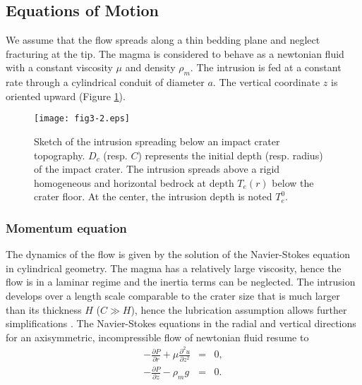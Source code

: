 \subsection{Equations of Motion}
	
We assume that the flow spreads along a thin bedding plane and neglect
fracturing  at the  tip.   The  magma is  considered  to  behave as  a
newtonian  fluid   with  a   constant  viscosity  $\mu$   and  density
$\rho_{m}$.   The  intrusion is  fed  at  a  constant rate  through  a
cylindrical conduit of  diameter $a$.  The vertical  coordinate $z$ is
oriented upward (Figure \ref{C5-fig3-2}).

\begin{figure}[h!]
  \graphicspath{ {/Users/thorey/Documents/These/Submission/Article/FFC_JGR_2013/Paper_APRES_2nd_REVIEW/} }
  \begin{center}
    \texttt{[image: fig3-2.eps]}
    \caption{Sketch of the intrusion  spreading below an impact crater
      topography.  $D_{c}$  (resp.  $C$) represents the  initial depth
      (resp. radius) of the impact crater. The intrusion spreads above
      a rigid  homogeneous and horizontal bedrock  at depth $T_{e}(r)$
      below the  crater floor. At  the center, the intrusion  depth is
      noted $T_{e}^0$.}
    \label{C5-fig3-2}
  \end{center}
\end{figure}
 	
\subsubsection{Momentum equation}
\label{C5-Equation_Momentum}
	
The dynamics of the flow is given by the solution of the Navier-Stokes
equation in  cylindrical geometry.  The  magma has a  relatively large
viscosity, hence the flow is in a laminar regime and the inertia terms
can  be  neglected.   The  intrusion  develops  over  a  length  scale
comparable to the  crater size that is much larger  than its thickness
$H$ ($C \gg H$), hence the lubrication assumption allows further
simplifications       \citep{Huppert:1982a,Michaut:2009jx}.        The
Navier-Stokes equations in  the radial and vertical  directions for an
axisymmetric, incompressible flow of newtonian fluid resume to
\begin{eqnarray}
  -\frac{\partial P}{\partial r} + \mu \frac{\partial^{2}u}{\partial z^{2}} &=&0\label{C5-eq4}, \\
  -\frac{\partial P}{\partial z} - \rho_{m}g& =&0.
                                                 \label{C5-eq5}
\end{eqnarray}

